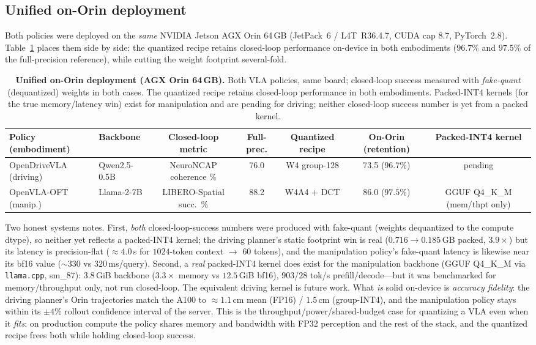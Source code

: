 \documentclass[conference]{IEEEtran}
\begin{document}
\subsection{Unified on-Orin deployment}
\label{sec:orin}
Both policies were deployed on the \emph{same} NVIDIA Jetson AGX Orin 64\,GB (JetPack~6 / L4T~R36.4.7,
CUDA cap $8.7$, PyTorch~2.8). Table~\ref{tab:orin} places them side by side: the quantized recipe
retains closed-loop performance on-device in both embodiments ($96.7\%$ and $97.5\%$ of the
full-precision reference), while cutting the weight footprint several-fold.

\begin{table}[t]\centering
\caption{\textbf{Unified on-Orin deployment (AGX Orin 64\,GB).} Both VLA policies, same board;
closed-loop success measured with \emph{fake-quant} (dequantized) weights in both cases. The quantized
recipe retains closed-loop performance in both embodiments. Packed-INT4 kernels (for the true
memory/latency win) exist for manipulation and are pending for driving; neither closed-loop success
number is yet from a packed kernel.}
\label{tab:orin}
\begin{tabular}{llccccc}
\toprule
Policy (embodiment) & Backbone & Closed-loop metric & Full-prec. & Quantized recipe & On-Orin (retention) & Packed-INT4 kernel \\
\midrule
OpenDriveVLA (driving)   & Qwen2.5-0.5B & NeuroNCAP coherence \% & 76.0 & W4 group-128 & 73.5 ($96.7\%$) & pending \\
OpenVLA-OFT (manip.)     & Llama-2-7B   & LIBERO-Spatial succ.\ \% & 88.2 & W4A4 + DCT & 86.0 ($97.5\%$) & GGUF Q4\_K\_M (mem/thpt only) \\
\bottomrule
\end{tabular}
\end{table}

Two honest systems notes. First, \emph{both} closed-loop-success numbers were produced with fake-quant
(weights dequantized to the compute dtype), so neither yet reflects a packed-INT4 kernel; the driving
planner's static footprint win is real ($0.716\to0.185$\,GB packed, $3.9\times$) but its latency is
precision-flat ($\approx\!4.0$\,s for $1024$-token context $\to$ $60$ tokens), and the manipulation
policy's fake-quant latency is likewise near its bf16 value ($\sim\!330$ vs $320$\,ms/query). Second,
a \emph{real} packed-INT4 kernel does exist for the manipulation backbone (GGUF Q4\_K\_M via
\texttt{llama.cpp}, sm\_87): $3.8$\,GiB backbone ($3.3\times$ memory vs $12.5$\,GiB bf16),
$903$/$28$ tok/s prefill/decode---but it was benchmarked for memory/throughput only, not run
closed-loop. The equivalent driving kernel is future work. What \emph{is} solid on-device is
\emph{accuracy fidelity}: the driving planner's Orin trajectories match the A100 to $\approx\!1.1$\,cm
mean (FP16) / $1.5$\,cm (group-INT4), and the manipulation policy stays within its $\pm4\%$ rollout
confidence interval of the server. This is the throughput/power/shared-budget case for quantizing a
VLA even when it \emph{fits}: on production compute the policy shares memory and bandwidth with FP32
perception and the rest of the stack, and the quantized recipe frees both while holding closed-loop
success.
\end{document}
